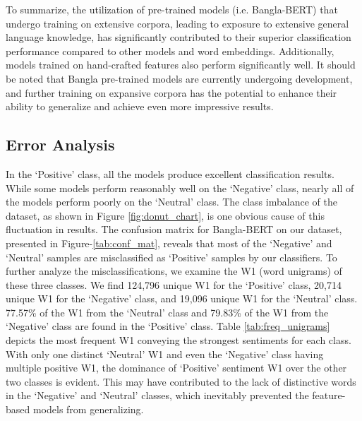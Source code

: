 To summarize, the utilization of pre-trained models (i.e. Bangla-BERT) that undergo training on extensive corpora, leading to exposure to extensive general language knowledge, has significantly contributed to their superior classification performance compared to other models and word embeddings. Additionally, models trained on hand-crafted features also perform significantly well. It should be noted that Bangla pre-trained models are currently undergoing development, and further training on expansive corpora has the potential to enhance their ability to generalize and achieve even more impressive results.

\subsection{Error Analysis}
In the `Positive' class, all the models produce excellent classification results. While some models perform reasonably well on the `Negative' class, nearly all of the models perform poorly on the `Neutral' class. The class imbalance of the dataset, as shown in Figure \ref{fig:donut_chart}, is one obvious cause of this fluctuation in results. The confusion matrix for Bangla-BERT on our dataset, presented in Figure-\ref{tab:conf_mat}, reveals that most of the `Negative' and `Neutral' samples are misclassified as `Positive' samples by our classifiers. To further analyze the misclassifications, we examine the W1 (word unigrams) of these three classes. We find 124,796 unique W1 for the `Positive' class, 20,714 unique W1 for the `Negative' class, and 19,096  unique W1 for the `Neutral' class. 77.57\% of the W1 from the `Neutral' class and 79.83\% of the W1 from the `Negative' class are found in the `Positive' class. Table \ref{tab:freq_unigrams} depicts the most frequent W1 conveying the strongest sentiments for each class.
With only one distinct `Neutral' W1 and even the `Negative' class having multiple positive W1, the dominance of `Positive' sentiment W1 over the other two classes is evident. This may have contributed to the lack of distinctive words in the `Negative' and `Neutral' classes, which inevitably prevented the feature-based models from generalizing.






